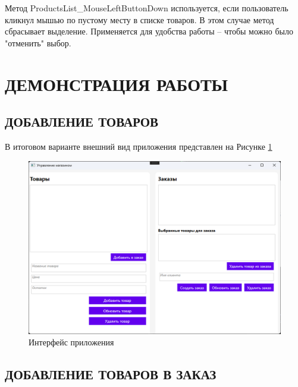 \documentclass[12pt]{article}
\renewcommand{\texttt}[1]{{\small\ttfamily #1}}
\begin{document}
Метод \texttt{ProductsList\_MouseLeftButtonDown} используется, если пользователь кликнул мышью по пустому месту в списке товаров. В этом случае метод сбрасывает выделение. Применяется для удобства работы -- чтобы можно было "отменить" выбор.

\pagebreak


\section{ДЕМОНСТРАЦИЯ РАБОТЫ \ \texorpdfstring{\faGlasses}{}}

\subsection{ДОБАВЛЕНИЕ ТОВАРОВ}

В итоговом варианте внешний вид приложения представлен на Рисунке \ref{fig:demo1}

\begin{figure}[ht]
	\centering
	\includegraphics[width=1.0\textwidth]{fig/image 26.png}
	\caption{Интерфейс приложения}
	\label{fig:demo1}
\end{figure}

\pagebreak


\subsection{ДОБАВЛЕНИЕ ТОВАРОВ В ЗАКАЗ}
\end{document}
